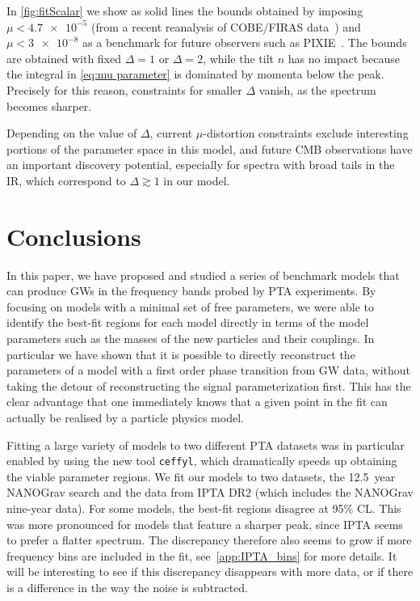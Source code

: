 \documentclass{article}
\begin{document}
In \cref{fig:fitScalar} we show as solid lines the bounds obtained by imposing $\mu < \num{4.7e-5}$ (from a recent reanalysis of COBE/FIRAS data~\cite{Bianchini:2022dqh}) and $\mu < \num{3e-8}$ as a benchmark for future observers such as PIXIE~\cite{Kite:2020uix}.
The bounds are obtained with fixed $\Delta = 1$ or $\Delta=2$, while the tilt $n$ has no impact because the integral in \cref{eq:mu parameter} is dominated by momenta below the peak. Precisely for this reason, constraints for smaller $\Delta$ vanish, as the spectrum becomes sharper.%


Depending on the value of $\Delta$, current $\mu$-distortion constraints exclude interesting portions of the parameter space in this model, and future CMB observations have an important discovery potential, especially for spectra with broad tails in the IR, which correspond to $\Delta \gtrsim 1$ in our model.

\section{Conclusions}
\label{sec:conclusion}

In this paper, we have proposed and studied a series of benchmark models that can produce GWs in the frequency bands probed by PTA experiments. By focusing on models with a minimal set of free parameters, we were able to identify the best-fit regions for each model directly in terms of the model parameters such as the masses of the new particles and their couplings. In particular we have shown that it is possible to directly reconstruct the parameters of a model with a first order phase transition from GW data, without taking the detour of reconstructing the signal parameterization first. This has the clear advantage that one immediately knows that a given point in the fit can actually be realised by a particle physics model. 

Fitting a large variety of models to two different PTA datasets was in particular enabled by using the new tool \texttt{ceffyl}, which dramatically speeds up obtaining the viable parameter regions. We fit our models to two datasets, the 12.5~year NANOGrav search and the data from IPTA DR2 (which includes the NANOGrav nine-year data). For some models, the best-fit regions disagree at 95\% CL. This was more pronounced for models that feature a sharper peak, since IPTA seems to prefer a flatter spectrum. The discrepancy therefore also seems to grow if more frequency bins are included in the fit, see~\cref{app:IPTA_bins} for more details. It will be interesting to see if this discrepancy disappears with more data, or if there is a difference in the way the noise is subtracted.
\end{document}
